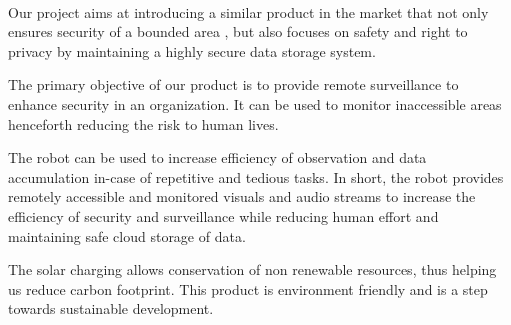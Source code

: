 \paragraph{}Our project aims at introducing a similar product in the market that not only ensures security of a bounded area , but also focuses on safety and right to privacy by maintaining a highly secure data storage system.
\newline

The primary objective of our product is to provide remote surveillance to enhance security in an organization. It can be used to monitor inaccessible areas henceforth reducing the risk to human lives.
\newline

The robot can be used to increase efficiency of observation and data accumulation in-case of repetitive and tedious tasks. In short, the robot provides remotely accessible and monitored visuals and audio streams to increase the efficiency of security and surveillance while reducing human effort and maintaining safe cloud storage of data.
\newline

The solar charging allows conservation of non renewable resources, thus helping us reduce carbon footprint. This product is environment friendly and is a step towards sustainable development.
